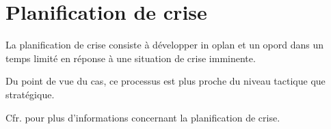 \section{Planification de crise}

La planification de crise consiste à développer in \gls{oplan} et un \gls{opord} dans un temps limité en réponse à une situation de crise imminente.

Du point de vue du \gls{cas}, ce processus est plus proche du niveau tactique que stratégique.

Cfr.  pour plus d'informations concernant la planification de crise.

